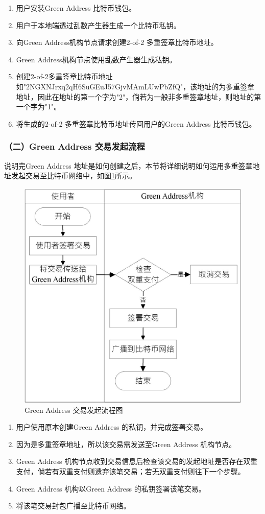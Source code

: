 			 	\begin{enumerate}
			 		\item 用户安装Green Address 比特币钱包。
			 		\item 用户于本地端透过乱数产生器生成一个比特币私钥。
			 		\item 向Green Address机构节点请求创建2-of-2 多重签章比特币地址。
			 		\item Green Address机构节点使用乱数产生器生成私钥。
					\item 创建2-of-2多重签章比特币地址如"2NGXNJrxq2qH6SuGEuJ57GjvMAmLUwPbZfQ"，该地址的为多重签章地址，因此在地址的第一个字为"2"，倘若为一般非多重签章地址，则地址的第一个字为"1"。
					\item 将生成的2-of-2 多重签章比特币地址传回用户的Green Address 比特币钱包。
			 	\end{enumerate}

			 	\subsubsection{（二）Green Address 交易发起流程}
			 	说明完Green Address 地址是如何创建之后，本节将详细说明如何运用多重签章地址发起交易至比特币网络中，如图\ref{gatx}所示。

			 	\begin{figure}[!htbp]
					\centering
					\includegraphics[width = .5\textwidth]{gatx.jpg}
					\caption{Green Address 交易发起流程图}\label{gatx}
				\end{figure}

				\begin{enumerate}
					\item 用户使用原本创建Green Address 的私钥，并完成签署交易。
					\item 因为是多重签章地址，所以该交易需发送至Green Address 机构节点。
					\item Green Address 机构节点收到交易信息后检查该交易的发起地址是否存在双重支付，倘若有双重支付则遗弃该笔交易；若无双重支付则往下一个步骤。
					\item Green Address 机构以Green Address 的私钥签署该笔交易。
					\item 将该笔交易封包广播至比特币网络。
				\end{enumerate}

